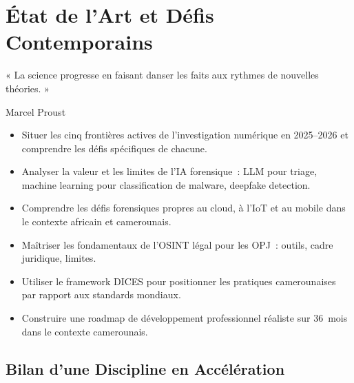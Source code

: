 
\chapter{État de l'Art et Défis Contemporains}
\label{chap:etat-art}

\epigraph{%
    « La science progresse en faisant danser les faits aux rythmes
    de nouvelles théories. »%
}{Marcel Proust}


\begin{boxobjectifs}
\begin{itemize}
    \item Situer les cinq frontières actives de l'investigation numérique
          en 2025--2026 et comprendre les défis spécifiques de chacune.
    \item Analyser la valeur et les limites de l'IA forensique~: LLM pour
          triage, machine learning pour classification de malware,
          deepfake detection.
    \item Comprendre les défis forensiques propres au cloud, à l'IoT et
          au mobile dans le contexte africain et camerounais.
    \item Maîtriser les fondamentaux de l'OSINT légal pour les OPJ~:
          outils, cadre juridique, limites.
    \item Utiliser le framework DICES pour positionner les pratiques
          camerounaises par rapport aux standards mondiaux.
    \item Construire une roadmap de développement professionnel réaliste
          sur 36~mois dans le contexte camerounais.
\end{itemize}
\end{boxobjectifs}

\bigskip

\section*{Bilan d'une Discipline en Accélération}

